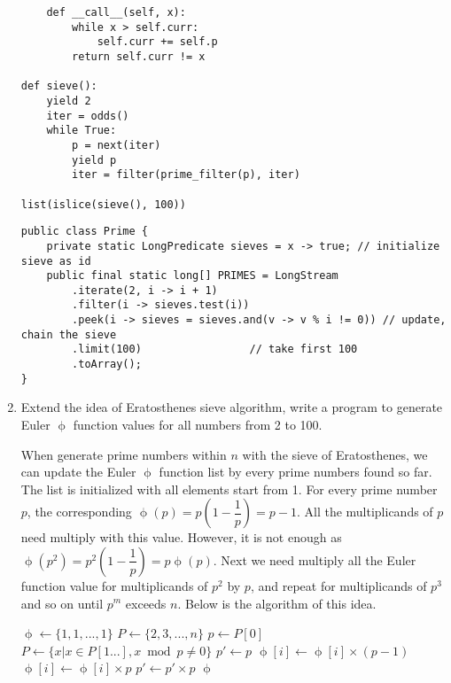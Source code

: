 \documentclass[UTF8]{article}
\begin{document}
\begin{enumerate}
\begin{lstlisting}
    def __call__(self, x):
        while x > self.curr:
            self.curr += self.p
        return self.curr != x

def sieve():
    yield 2
    iter = odds()
    while True:
        p = next(iter)
        yield p
        iter = filter(prime_filter(p), iter)

list(islice(sieve(), 100))
\end{lstlisting}

\lstset{language=Java}
\begin{lstlisting}
public class Prime {
    private static LongPredicate sieves = x -> true; // initialize sieve as id
    public final static long[] PRIMES = LongStream
        .iterate(2, i -> i + 1)
        .filter(i -> sieves.test(i))
        .peek(i -> sieves = sieves.and(v -> v % i != 0)) // update, chain the sieve
        .limit(100)                 // take first 100
        .toArray();
}
\end{lstlisting}

\item{Extend the idea of Eratosthenes sieve algorithm, write a program to generate Euler $\upphi$ function values for all numbers from 2 to 100.}

When generate prime numbers within $n$ with the sieve of Eratosthenes, we can update the Euler $\upphi$ function list by every prime numbers found so far. The list is initialized with all elements start from 1. For every prime number $p$, the corresponding $\upphi(p) = p(1 - \dfrac{1}{p}) = p - 1$. All the multiplicands of $p$ need multiply with this value. However, it is not enough as $\upphi(p^2) = p^2(1 - \dfrac{1}{p}) = p \upphi(p)$. Next we need multiply all the Euler function value for multiplicands of $p^2$ by $p$, and repeat for multiplicands of $p^3$ and so on until $p^m$ exceeds $n$. Below is the algorithm of this idea.

\begin{algorithmic}
  \State $\upphi \gets \{1, 1, ..., 1\}$ 
  \State $P \gets \{2, 3, ..., n\}$ 
    \State $p \gets P[0]$
    \State $P \gets \{x | x \in P[1...], x \bmod p \neq 0\}$
    \State $p' \gets p$
    \Repeat
          \State $\upphi[i] \gets \upphi[i] \times (p - 1)$
        \Else
          \State $\upphi[i] \gets \upphi[i] \times p$
        \EndIf
      \EndFor
      \State $p' \gets p' \times p$
  \EndWhile
  \State \Return $\upphi$
\EndFunction
\end{algorithmic}


\end{enumerate}
\end{document}
